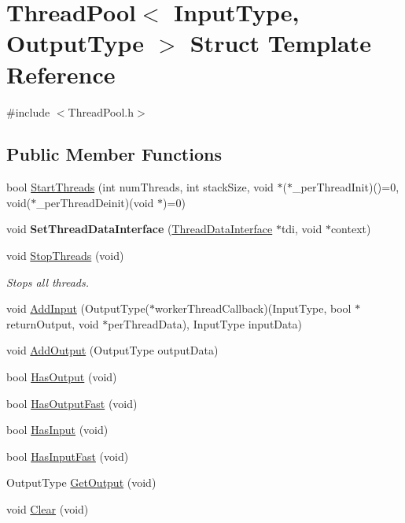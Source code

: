 \hypertarget{struct_thread_pool}{\section{Thread\-Pool$<$ Input\-Type, Output\-Type $>$ Struct Template Reference}
\label{struct_thread_pool}
}


{\ttfamily \#include $<$Thread\-Pool.\-h$>$}

\subsection*{Public Member Functions}
\begin{DoxyCompactItemize}
\item 
bool \hyperlink{struct_thread_pool_a09fde0ca678340723840fae1dcda51a2}{Start\-Threads} (int num\-Threads, int stack\-Size, void $\ast$($\ast$\-\_\-per\-Thread\-Init)()=0, void($\ast$\-\_\-per\-Thread\-Deinit)(void $\ast$)=0)
\item 
\hypertarget{struct_thread_pool_ad2bca8ada8b0f6c30ee3c49b90a1d31e}{void {\bfseries Set\-Thread\-Data\-Interface} (\hyperlink{class_thread_data_interface}{Thread\-Data\-Interface} $\ast$tdi, void $\ast$context)}\label{struct_thread_pool_ad2bca8ada8b0f6c30ee3c49b90a1d31e}

\item 
\hypertarget{struct_thread_pool_ad93b8ba41d96c5f0f814ae0acabfcdfc}{void \hyperlink{struct_thread_pool_ad93b8ba41d96c5f0f814ae0acabfcdfc}{Stop\-Threads} (void)}\label{struct_thread_pool_ad93b8ba41d96c5f0f814ae0acabfcdfc}

\begin{DoxyCompactList}\small\item\em Stops all threads. \end{DoxyCompactList}\item 
void \hyperlink{struct_thread_pool_a5f64a8c4a4400106a2d7d03f7f9de132}{Add\-Input} (Output\-Type($\ast$worker\-Thread\-Callback)(Input\-Type, bool $\ast$return\-Output, void $\ast$per\-Thread\-Data), Input\-Type input\-Data)
\item 
void \hyperlink{struct_thread_pool_a833f8cc619dbf051c525c2ecd7ce78a0}{Add\-Output} (Output\-Type output\-Data)
\item 
bool \hyperlink{struct_thread_pool_a925d6c332e4c48bc99dc5750dfd5fcdd}{Has\-Output} (void)
\item 
bool \hyperlink{struct_thread_pool_a5d517170f4b61211325ac5c9717e32e1}{Has\-Output\-Fast} (void)
\item 
bool \hyperlink{struct_thread_pool_aac1ae43b7b3581b5ae9803c7cae7b724}{Has\-Input} (void)
\item 
bool \hyperlink{struct_thread_pool_adde82517b452d9a74e91114a3783ce02}{Has\-Input\-Fast} (void)
\item 
Output\-Type \hyperlink{struct_thread_pool_a568e3e2035977a38ad35aeee74ed7388}{Get\-Output} (void)
\item 
\hypertarget{struct_thread_pool_af1e0cc5c3c8786fc49f60aef34160cbd}{void \hyperlink{struct_thread_pool_af1e0cc5c3c8786fc49f60aef34160cbd}{Clear} (void)}\label{struct_thread_pool_af1e0cc5c3c8786fc49f60aef34160cbd}


\end{DoxyCompactItemize}
